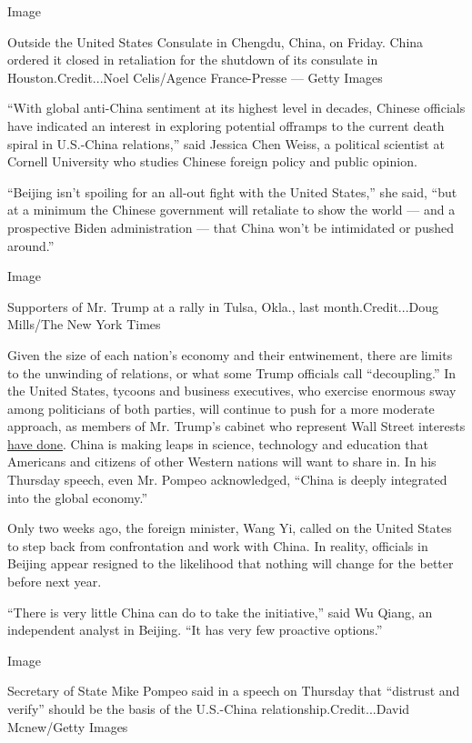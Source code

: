 Image

Outside the United States Consulate in Chengdu, China, on Friday. China
ordered it closed in retaliation for the shutdown of its consulate in
Houston.Credit...Noel Celis/Agence France-Presse --- Getty Images

``With global anti-China sentiment at its highest level in decades,
Chinese officials have indicated an interest in exploring potential
offramps to the current death spiral in U.S.-China relations,'' said
Jessica Chen Weiss, a political scientist at Cornell University who
studies Chinese foreign policy and public opinion.

``Beijing isn't spoiling for an all-out fight with the United States,''
she said, ``but at a minimum the Chinese government will retaliate to
show the world --- and a prospective Biden administration --- that China
won't be intimidated or pushed around.''

Image

Supporters of Mr. Trump at a rally in Tulsa, Okla., last
month.Credit...Doug Mills/The New York Times

Given the size of each nation's economy and their entwinement, there are
limits to the unwinding of relations, or what some Trump officials call
``decoupling.'' In the United States, tycoons and business executives,
who exercise enormous sway among politicians of both parties, will
continue to push for a more moderate approach, as members of Mr. Trump's
cabinet who represent Wall Street interests
\href{https://www.nytimes3xbfgragh.onion/2020/04/02/us/politics/coronavirus-trump-china.html}{have
done}. China is making leaps in science, technology and education that
Americans and citizens of other Western nations will want to share in.
In his Thursday speech, even Mr. Pompeo acknowledged, ``China is deeply
integrated into the global economy.''

Only two weeks ago, the foreign minister, Wang Yi, called on the United
States to step back from confrontation and work with China. In reality,
officials in Beijing appear resigned to the likelihood that nothing will
change for the better before next year.

``There is very little China can do to take the initiative,'' said Wu
Qiang, an independent analyst in Beijing. ``It has very few proactive
options.''

Image

Secretary of State Mike Pompeo said in a speech on Thursday that
``distrust and verify'' should be the basis of the U.S.-China
relationship.Credit...David Mcnew/Getty Images

